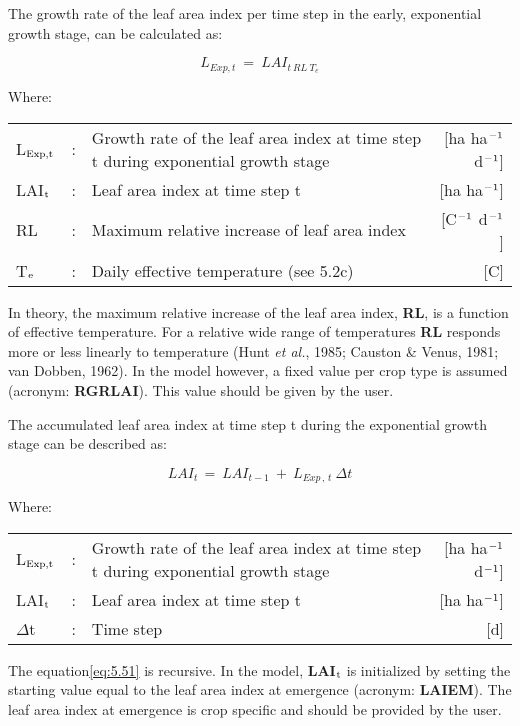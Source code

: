 The growth rate of the leaf area index per time step in the early, exponential growth
stage, can be calculated as:

\begin{equation}
L _{Exp,t} ~=~LAI _{{t~RL~T}_{e}}
\end{equation}

Where:\\[5pt]
\begin{tabularx}{\textwidth}{llXr}
	L$_{{\rm Exp,t}}$ &:& Growth rate of the leaf area index at time step t
	during exponential growth stage   &    [ha ha$^{{\rm -1}}$ d$^{{\rm -1}}$]\\
	LAI$_{{\rm t}}$ &:& Leaf area index at time step t    &
	[ha ha$^{{\rm -1}}$]\\
	RL &:& Maximum relative increase of leaf area index   &
	[\degrees C$^{{\rm -1}}$ d$^{{\rm -1}}$]\\
	T$_{{\rm e}}$ &:& Daily effective temperature (see 5.2c)   &
	[\degrees C]\\
\end{tabularx}

In theory, the maximum relative increase of the leaf area index, {\bf RL}, is a function of
effective temperature. For a relative wide range of temperatures {\bf RL} responds more or
less linearly to temperature (Hunt {\it et al.}, 1985; Causton \& Venus, 1981; van Dobben,
1962). In the model however, a fixed value per crop type is assumed (acronym: 
{\bf RGRLAI}). This value should be given by the user.

The accumulated leaf area index at time step t during the exponential growth stage can be
described as:

\begin{equation}
\label{eq:5.51}
LAI _{t~} =~LAI _{t-1} ~+~L _{Exp\, ,\, t} ~\Delta t
\end{equation}

Where:\\[5pt]
\begin{tabularx}{\textwidth}{llXr}
	L$_{{\rm Exp,t}}$ &:& Growth rate of the leaf area index at time step t
	during exponential growth stage    &    [ha ha$^{{\rm -1}}$ d$^{{\rm -1}}$]\\
	LAI$_{{\rm t}}$ &:& Leaf area index at time step t   &
	[ha ha$^{{\rm -1}}$]\\
	$\Delta$t &:& Time step   &    [d]
\end{tabularx}

The equation\ref{eq:5.51} is recursive. In the model, {\bf LAI$_{{\rm t}}$} is initialized by 
setting the starting
value equal to the leaf area index at emergence (acronym: {\bf LAIEM}). The leaf area index
at emergence is crop specific and should be provided by the user.

